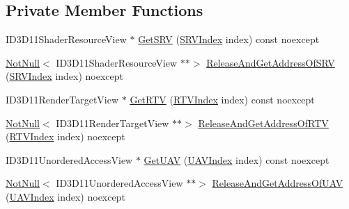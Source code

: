 \subsection*{Private Member Functions}
\begin{DoxyCompactItemize}
\item 
I\+D3\+D11\+Shader\+Resource\+View $\ast$ \mbox{\hyperlink{classmage_1_1rendering_1_1_output_manager_a0dc5e124cbd78351b78cc7a3e7bff428}{Get\+S\+RV}} (\mbox{\hyperlink{classmage_1_1rendering_1_1_output_manager_a941f1b35a83ee0ce190494523ec0fe63}{S\+R\+V\+Index}} index) const noexcept
\item 
\mbox{\hyperlink{namespacemage_a8769f9d670d6b585ea306cb1062af94b}{Not\+Null}}$<$ I\+D3\+D11\+Shader\+Resource\+View $\ast$$\ast$$>$ \mbox{\hyperlink{classmage_1_1rendering_1_1_output_manager_afd13c25f8ab6cfafc5d694d3b64405f9}{Release\+And\+Get\+Address\+Of\+S\+RV}} (\mbox{\hyperlink{classmage_1_1rendering_1_1_output_manager_a941f1b35a83ee0ce190494523ec0fe63}{S\+R\+V\+Index}} index) noexcept
\item 
I\+D3\+D11\+Render\+Target\+View $\ast$ \mbox{\hyperlink{classmage_1_1rendering_1_1_output_manager_a2088241f582fd9b119f485c5e9a13b30}{Get\+R\+TV}} (\mbox{\hyperlink{classmage_1_1rendering_1_1_output_manager_af9caebb7e9cacf454d26b827a01e857c}{R\+T\+V\+Index}} index) const noexcept
\item 
\mbox{\hyperlink{namespacemage_a8769f9d670d6b585ea306cb1062af94b}{Not\+Null}}$<$ I\+D3\+D11\+Render\+Target\+View $\ast$$\ast$$>$ \mbox{\hyperlink{classmage_1_1rendering_1_1_output_manager_a997a7c48090b5b68e643f3158e9e9d7e}{Release\+And\+Get\+Address\+Of\+R\+TV}} (\mbox{\hyperlink{classmage_1_1rendering_1_1_output_manager_af9caebb7e9cacf454d26b827a01e857c}{R\+T\+V\+Index}} index) noexcept
\item 
I\+D3\+D11\+Unordered\+Access\+View $\ast$ \mbox{\hyperlink{classmage_1_1rendering_1_1_output_manager_a6eb1f3b756f121897fd869c355944e86}{Get\+U\+AV}} (\mbox{\hyperlink{classmage_1_1rendering_1_1_output_manager_a71b3797fef957312f92736f15b7ada3e}{U\+A\+V\+Index}} index) const noexcept
\item 
\mbox{\hyperlink{namespacemage_a8769f9d670d6b585ea306cb1062af94b}{Not\+Null}}$<$ I\+D3\+D11\+Unordered\+Access\+View $\ast$$\ast$$>$ \mbox{\hyperlink{classmage_1_1rendering_1_1_output_manager_a79ec82aadfe89ea1a9875567d9bbb74a}{Release\+And\+Get\+Address\+Of\+U\+AV}} (\mbox{\hyperlink{classmage_1_1rendering_1_1_output_manager_a71b3797fef957312f92736f15b7ada3e}{U\+A\+V\+Index}} index) noexcept
\item 

\end{DoxyCompactItemize}
